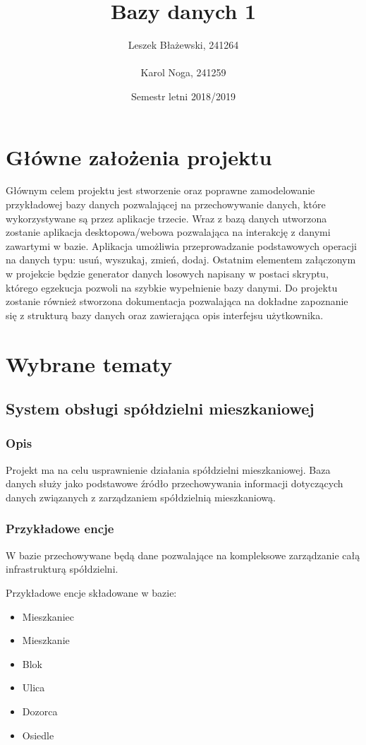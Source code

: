 \documentclass{article}
\title{Bazy danych 1}
\author{Leszek Błażewski, 241264 \\ \\Karol Noga, 241259}
\date{Semestr letni 2018/2019}
\begin{document}
\maketitle
\clearpage

\section{Główne założenia projektu}
Głównym celem projektu jest stworzenie oraz poprawne zamodelowanie przykładowej bazy danych pozwalającej na przechowywanie danych, które wykorzystywane są przez aplikacje trzecie. Wraz z bazą danych utworzona zostanie aplikacja desktopowa/webowa pozwalająca na interakcję z danymi zawartymi w bazie. Aplikacja umożliwia przeprowadzanie podstawowych operacji na danych typu: usuń, wyszukaj, zmień, dodaj. Ostatnim elementem załączonym w projekcie będzie generator danych losowych napisany w postaci skryptu, którego egzekucja pozwoli na szybkie wypełnienie bazy danymi. Do projektu zostanie również stworzona dokumentacja pozwalająca na dokładne zapoznanie się z strukturą bazy danych oraz zawierająca opis interfejsu użytkownika.

\section{Wybrane tematy}
\subsection{System obsługi spółdzielni mieszkaniowej}

\subsubsection{Opis}
Projekt ma na celu usprawnienie działania spółdzielni mieszkaniowej. Baza danych służy jako podstawowe źródło przechowywania informacji dotyczących danych związanych z zarządzaniem spółdzielnią mieszkaniową.

\subsubsection{Przykładowe encje}
W bazie przechowywane będą dane pozwalające na kompleksowe zarządzanie całą infrastrukturą spółdzielni.
\vspace{1mm}

Przykładowe encje składowane w bazie:
 \begin{itemize}
    \item Mieszkaniec
    \item Mieszkanie
    \item Blok
    \item Ulica
    \item Dozorca
    \item Osiedle
\end{itemize}
\end{document}
